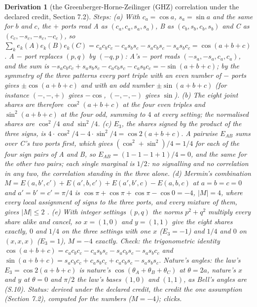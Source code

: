 \documentclass[pdflatex,sn-mathphys-num]{sn-jnl}
\theoremstyle{thmstyleone}
\newtheorem{derivation}{Derivation}
\begin{document}
\begin{derivation}[the Greenberger-Horne-Zeilinger (GHZ) correlation under the declared credit, Section 7.2]
\emph{Steps:} (a) With $c_a = \cos a$, $s_a = \sin a$ and the same for $b$ and $c$, the $+$ ports read A as $(c_a, c_a, s_a, s_a)$, B as $(c_b, s_b, c_b, s_b)$ and C as $(c_c, -s_c, -s_c, -c_c)$, so $\sum_k e_k(A)e_k(B)e_k(C) = c_a c_b c_c - c_a s_b s_c - s_a c_b s_c - s_a s_b c_c = \cos(a + b + c)$. A $-$ port replaces $(p, q)$ by $(-q, p)$: A's $-$ port reads $(-s_a, -s_a, c_a, c_a)$, and the sum is $-s_a c_b c_c + s_a s_b s_c - c_a c_b s_c - c_a s_b c_c = -\sin(a + b + c)$; by the symmetry of the three patterns every port triple with an even number of $-$ ports gives $\pm\cos(a + b + c)$ and with an odd number $\pm\sin(a + b + c)$ (for instance $(-, -, +)$ gives $-\cos$, $(-, -, -)$ gives $\sin$). (b) The eight joint shares are therefore $\cos^2(a + b + c)$ at the four even triples and $\sin^2(a + b + c)$ at the four odd, summing to $4$ at every setting; the normalised shares are $\cos^2 / 4$ and $\sin^2 / 4$. (c) $E_3$, the shares signed by the product of the three signs, is $4\cdot\cos^2 / 4 - 4\cdot\sin^2 / 4 = \cos 2(a + b + c)$. A pairwise $E_{AB}$ sums over C's two ports first, which gives $(\cos^2 + \sin^2) / 4 = 1 / 4$ for each of the four sign pairs of A and B, so $E_{AB} = (1 - 1 - 1 + 1) / 4 = 0$, and the same for the other two pairs; each single marginal is $1 / 2$: no signalling and no correlation in any two, the correlation standing in the three alone. (d) Mermin's combination $M = E(a, b', c') + E(a', b, c') + E(a', b', c) - E(a, b, c)$ at $a = b = c = 0$ and $a' = b' = c' = \pi / 4$ is $\cos\pi + \cos\pi + \cos\pi - \cos 0 = -4$, $|M| = 4$, where every local assignment of signs to the three ports, and every mixture of them, gives $|M| \le 2$ \cite{mermin}. (e) With integer settings $(p, q)$ the norms $p^2 + q^2$ multiply every share alike and cancel, so $x = (1, 0)$ and $y = (1, 1)$ give the eight shares exactly, $0$ and $1 / 4$ on the three settings with one $x$ ($E_3 = -1$) and $1 / 4$ and $0$ on $(x, x, x)$ ($E_3 = 1$), $M = -4$ exactly. \emph{Check:} the trigonometric identity $\cos(a + b + c) = c_a c_b c_c - c_a s_b s_c - s_a c_b s_c - s_a s_b c_c$ and $\sin(a + b + c) = s_a c_b c_c + c_a s_b c_c + c_a c_b s_c - s_a s_b s_c$. \emph{Nature's angles:} the law's $E_3 = \cos 2(a + b + c)$ is nature's $\cos(\theta_A + \theta_B + \theta_C)$ at $\theta = 2a$, nature's $x$ and $y$ at $\theta = 0$ and $\pi / 2$ the law's bases $(1, 0)$ and $(1, 1)$, as Bell's angles are (S.10). \emph{Status:} derived under the declared credit, the credit the one assumption (Section 7.2), computed for the numbers ($M = -4$); clicks.
\end{derivation}
\end{document}
